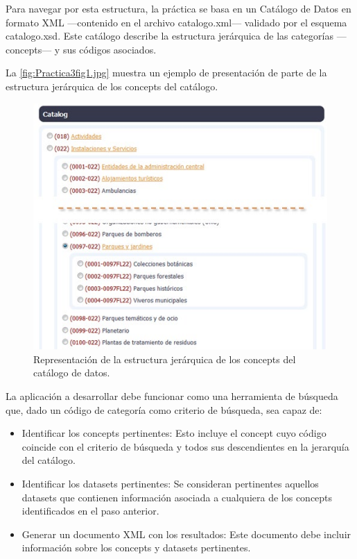 Para navegar por esta estructura, la práctica se basa en un Catálogo de Datos en formato XML ---contenido en el archivo catalogo.xml--- validado por el esquema catalogo.xsd. Este catálogo describe la estructura jerárquica de las categorías ---concepts--- y sus códigos asociados.

La \autoref{fig:Practica3fig1.jpg} muestra un ejemplo de presentación de parte de la estructura jerárquica de los concepts del catálogo.

\begin{figure}[H]
    \centering
    \includegraphics[width=\textwidth]{imagenes/Practica3fig1.jpg}
    \caption{Representación de la estructura jerárquica de los concepts del catálogo de datos.}
    \label{fig:Practica3fig1.jpg}
\end{figure}

La aplicación a desarrollar debe funcionar como una herramienta de búsqueda que, dado un código de categoría como criterio de búsqueda, sea capaz de:

\begin{itemize}
  \item Identificar los concepts pertinentes: Esto incluye el concept cuyo código coincide con el criterio de búsqueda y todos sus descendientes en la jerarquía del catálogo.
  \item Identificar los datasets pertinentes: Se consideran pertinentes aquellos datasets que contienen información asociada a cualquiera de los concepts identificados en el paso anterior.
  \item Generar un documento XML con los resultados: Este documento debe incluir información sobre los concepts y datasets pertinentes.
\end{itemize}

